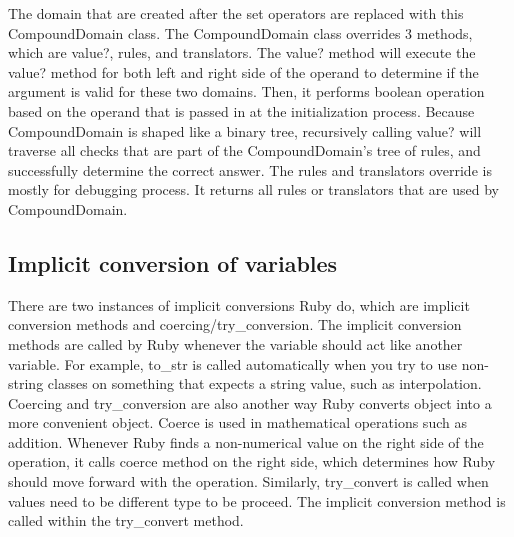 The domain that are created after the set operators are replaced with this CompoundDomain class.  The CompoundDomain class overrides 3 methods, which are value?, rules, and translators.  The value? method will execute the value? method for both left and right side of the operand to determine if the argument is valid for these two domains.  Then, it performs boolean operation based on the operand that is passed in at the initialization process.  Because CompoundDomain is shaped like a binary tree, recursively calling value? will traverse all checks that are part of the CompoundDomain's tree of rules, and successfully determine the correct answer.  The rules and translators override is mostly for debugging process.  It returns all rules or translators that are used by CompoundDomain.

\subsection{Implicit conversion of variables}

There are two instances of implicit conversions Ruby do, which are implicit conversion methods and coercing/try\_conversion.  The implicit conversion methods are called by Ruby whenever the variable should act like another variable.  For example, to\_str is called automatically when you try to use non{-}string classes on something that expects a string value, such as interpolation.  Coercing and try\_conversion are also another way Ruby converts object into a more convenient object.  Coerce is used in mathematical operations such as addition.  Whenever Ruby finds a non{-}numerical value on the right side of the operation, it calls coerce method on the right side, which determines how Ruby should move forward with the operation.  Similarly, try\_convert is called when values need to be different type to be proceed.  The implicit conversion method is called within the try\_convert method.

